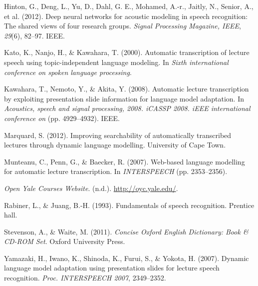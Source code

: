 \documentclass[]{article}
\begin{document}
Hinton, G., Deng, L., Yu, D., Dahl, G. E., Mohamed, A.-r., Jaitly, N.,
Senior, A., et al. (2012). Deep neural networks for acoustic modeling in
speech recognition: The shared views of four research groups.
\emph{Signal Processing Magazine, IEEE}, \emph{29}(6), 82--97. IEEE.

Kato, K., Nanjo, H., \& Kawahara, T. (2000). Automatic transcription of
lecture speech using topic-independent language modeling. In \emph{Sixth
international conference on spoken language processing}.

Kawahara, T., Nemoto, Y., \& Akita, Y. (2008). Automatic lecture
transcription by exploiting presentation slide information for language
model adaptation. In \emph{Acoustics, speech and signal processing,
2008. iCASSP 2008. iEEE international conference on} (pp. 4929--4932).
IEEE.

Marquard, S. (2012). Improving searchability of automatically
transcribed lectures through dynamic language modelling. University of
Cape Town.

Munteanu, C., Penn, G., \& Baecker, R. (2007). Web-based language
modelling for automatic lecture transcription. In \emph{INTERSPEECH}
(pp. 2353--2356).

\emph{Open Yale Courses Website}. (n.d.). \url{http://oyc.yale.edu/}.

Rabiner, L., \& Juang, B.-H. (1993). Fundamentals of speech recognition.
Prentice hall.

Stevenson, A., \& Waite, M. (2011). \emph{Concise Oxford English
Dictionary: Book \& CD-ROM Set}. Oxford University Press.

Yamazaki, H., Iwano, K., Shinoda, K., Furui, S., \& Yokota, H. (2007).
Dynamic language model adaptation using presentation slides for lecture
speech recognition. \emph{Proc. INTERSPEECH 2007}, 2349--2352.
\end{document}
